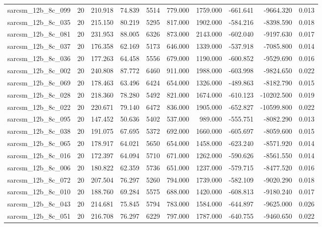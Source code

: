 \begin{tabular}{lrrrrrrrrr}
sarcsm\_12b\_8c\_099 & 20 & 210.918 & 74.839 & 5514 & 779.000 & 1759.000 & -661.641 & -9664.320 & 0.013 \\
sarcsm\_12b\_8c\_035 & 20 & 215.150 & 80.219 & 5295 & 817.000 & 1902.000 & -584.216 & -8398.590 & 0.018 \\
sarcsm\_12b\_8c\_081 & 20 & 231.953 & 88.005 & 6326 & 873.000 & 2143.000 & -602.040 & -9197.630 & 0.017 \\
sarcsm\_12b\_8c\_037 & 20 & 176.358 & 62.169 & 5173 & 646.000 & 1339.000 & -537.918 & -7085.800 & 0.014 \\
sarcsm\_12b\_8c\_036 & 20 & 177.263 & 64.458 & 5556 & 679.000 & 1190.000 & -600.852 & -9529.690 & 0.016 \\
sarcsm\_12b\_8c\_002 & 20 & 240.808 & 87.772 & 6460 & 911.000 & 1988.000 & -603.998 & -9824.650 & 0.022 \\
sarcsm\_12b\_8c\_069 & 20 & 178.463 & 63.496 & 6424 & 654.000 & 1326.000 & -489.863 & -8182.790 & 0.015 \\
sarcsm\_12b\_8c\_028 & 20 & 218.360 & 78.280 & 5492 & 821.000 & 1674.000 & -610.123 & -10202.500 & 0.019 \\
sarcsm\_12b\_8c\_022 & 20 & 220.671 & 79.140 & 6472 & 836.000 & 1905.000 & -652.827 & -10599.800 & 0.022 \\
sarcsm\_12b\_8c\_095 & 20 & 147.452 & 50.636 & 5402 & 537.000 & 989.000 & -555.751 & -8082.290 & 0.013 \\
sarcsm\_12b\_8c\_038 & 20 & 191.075 & 67.695 & 5372 & 692.000 & 1660.000 & -605.697 & -8059.600 & 0.015 \\
sarcsm\_12b\_8c\_065 & 20 & 178.917 & 64.021 & 5650 & 654.000 & 1458.000 & -623.240 & -8571.920 & 0.014 \\
sarcsm\_12b\_8c\_016 & 20 & 172.397 & 64.094 & 5710 & 671.000 & 1262.000 & -590.626 & -8561.550 & 0.014 \\
sarcsm\_12b\_8c\_006 & 20 & 180.822 & 62.359 & 5736 & 651.000 & 1237.000 & -579.715 & -8477.520 & 0.016 \\
sarcsm\_12b\_8c\_072 & 20 & 207.504 & 76.297 & 5260 & 794.000 & 1739.000 & -582.109 & -9020.290 & 0.018 \\
sarcsm\_12b\_8c\_010 & 20 & 188.760 & 69.284 & 5575 & 688.000 & 1420.000 & -608.813 & -9180.240 & 0.017 \\
sarcsm\_12b\_8c\_043 & 20 & 214.681 & 75.845 & 5794 & 783.000 & 1584.000 & -644.897 & -9625.000 & 0.026 \\
sarcsm\_12b\_8c\_051 & 20 & 216.708 & 76.297 & 6229 & 797.000 & 1787.000 & -640.755 & -9460.650 & 0.022 \\

\end{tabular}
